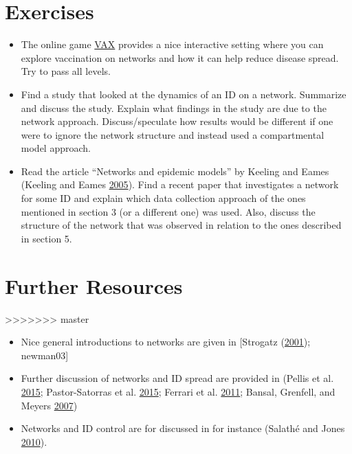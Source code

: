 \documentclass[]{book}
\providecommand{\tightlist}{%
  \setlength{\itemsep}{0pt}\setlength{\parskip}{0pt}}
\theoremstyle{definition}
\theoremstyle{definition}
\theoremstyle{definition}
\theoremstyle{remark}
\begin{document}
\section{Exercises}\label{exercises-17}

\begin{itemize}
\tightlist
\item
  The online game \href{http://vax.herokuapp.com/}{VAX} provides a nice
  interactive setting where you can explore vaccination on networks and
  how it can help reduce disease spread. Try to pass all levels.
\item
  Find a study that looked at the dynamics of an ID on a network.
  Summarize and discuss the study. Explain what findings in the study
  are due to the network approach. Discuss/speculate how results would
  be different if one were to ignore the network structure and instead
  used a compartmental model approach.
\item
  Read the article ``Networks and epidemic models'' by Keeling and Eames
  (Keeling and Eames \protect\hyperlink{ref-keeling05}{2005}). Find a
  recent paper that investigates a network for some ID and explain which
  data collection approach of the ones mentioned in section 3 (or a
  different one) was used. Also, discuss the structure of the network
  that was observed in relation to the ones described in section 5.
\end{itemize}

\section{Further Resources}\label{further-resources-17}
>>>>>>> master

\begin{itemize}
\tightlist
\item
  Nice general introductions to networks are given in {[}Strogatz
  (\protect\hyperlink{ref-strogatz01}{2001}); newman03{]}
\item
  Further discussion of networks and ID spread are provided in (Pellis
  et al. \protect\hyperlink{ref-pellis15}{2015}; Pastor-Satorras et al.
  \protect\hyperlink{ref-pastor-satorras15}{2015}; Ferrari et al.
  \protect\hyperlink{ref-ferrari11}{2011}; Bansal, Grenfell, and Meyers
  \protect\hyperlink{ref-bansal07}{2007})
\item
  Networks and ID control are for discussed in for instance (Salathé and
  Jones \protect\hyperlink{ref-salathe10}{2010}).
\end{itemize}
\end{document}

